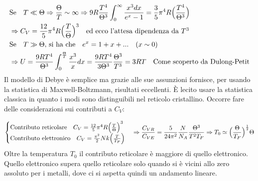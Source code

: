 \begin{equation}
\begin{split}
& \mbox{Se} \quad T \ll \Theta \Rightarrow \frac{ \Theta}{T } \sim \infty \Rightarrow 9R \frac{ T^4}{\Theta^3} \int_0^{\infty} \frac{ x^3 dx}{e^x - 1} = \frac{ 3}{5 } \pi^4 R \Bigl(  \frac{ T^4}{ \Theta^3}  \Bigr) \\
& \Rightarrow C_V = \frac{ 12}{5 } \pi^4 R \Bigl(  \frac{ T}{\Theta }  \Bigr)^3 \quad \mbox{ed ecco l'attesa dipendenza da $T^3$} \\
& \mbox{Se} \quad T \gg \Theta \mbox{, si ha che} \quad e^x = 1 + x + ... \quad (x \sim 0) \\
& \Rightarrow U = \frac{ 9R T^4}{\Theta^3 } \int_0^{\frac{ \Theta}{ T}} \frac{ x^3}{x }dx = \frac{ 9 R T^4}{3 \Theta^3 } \frac{ \Theta^3}{T^3 } = 3RT \quad \mbox{Come scoperto da Dulong-Petit}
\end{split}
\end{equation}
Il modello di Debye è semplice ma grazie alle sue assunzioni fornisce, per usando la statistica di Maxwell-Boltzmann, risultati eccellenti.
È lecito usare la statistica classica in quanto i modi sono distinguibili nel reticolo cristallino.
Occorre fare delle considerazioni sui contributi a $C_V$:

\begin{equation}
\begin{cases}
	\mbox{Contributo reticolare} \quad C_V = \frac{ 12}{5 } \pi^4 R \Bigl(  \frac{ T}{\Theta }  \Bigr)^3 \\
	\mbox{Contributo elettronico} \quad C_V = \frac{ \pi^2}{2 } N k \Bigl(  \frac{ T}{T_F}  \Bigr) \\
\end{cases}
\Rightarrow \frac{ C_{VR}}{C_{VE} } = \frac{ 5}{24 \pi^2 }\frac{ N}{N_A } \frac{ \Theta^3}{T^2 T_F } \Rightarrow T_0 \simeq \Bigl(  \frac{ \Theta}{T_F }  \Bigr)^{ \frac{ 1}{2 } } \Theta
\end{equation}
Oltre la temperatura $T_0$ il contributo reticolare è maggiore di quello elettronico.
Quello elettronico supera quello reticolare solo quando si è vicini allo zero assoluto per i metalli, dove ci si aspetta quindi un andamento lineare. 


























